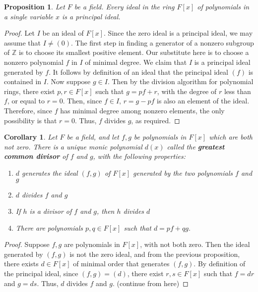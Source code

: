 \documentclass[12pt]{article}
\newtheorem{cor}[thm]{Corollary}
\newtheorem{prop}[thm]{Proposition}
\theoremstyle{definition}
\theoremstyle{remark}
\numberwithin{equation}{section}
\newcommand\Z{\mathbb Z}    %
\newcommand\B[1]{\textbf{ #1}}
\begin{document}
\begin{prop}
        Let $F$ be a field. Every ideal in the ring $F[x]$ of polynomials in a single variable $x$ is a principal ideal.
\end{prop}
\begin{proof}
        Let $I$ be an ideal of $F[x]$. Since the zero ideal is a principal ideal, we may assume that $I \neq (0)$. The first step in finding a generator of a nonzero subgroup of $\Z$ is to choose its smallest positive element. Our substitute here is to choose a nonzero polynomial $f$ in $I$ of minimal degree. We claim that $I$ is a principal ideal generated by $f$. It follows by definition of an ideal that the principal ideal $(f)$ is contained in $I$. Now suppose $g \in I$. Then by the division algorithm for polynomial rings, there exist $p,r \in F[x]$ such that $g = pf + r$, with the degree of $r$ less than $f$, or equal to $r=0$. Then, since $f \in I$, $r = g - pf$ is also an element of the ideal. Therefore, since $f$ has minimal degree among nonzero elements, the only possibility is that $r = 0$. Thus, $f$ divides $g$, as required.
\end{proof}


\vspace{15pt}

\begin{cor}
        Let $F$ be a field, and let $f,g$ be polynomials in $F[x]$ which are both not zero. There is a unique monic polynomial $d(x)$ called the \B{greatest common divisor} of $f$ and $g$, with the following properties: \begin{enumerate}
                \item $d$ generates the ideal $(f,g)$ of $F[x]$ generated by the two polynomials $f$ and $g$
                \item $d$ divides $f$ and $g$
                \item If $h$ is a divisor of $f$ and $g$, then $h$ divides $d$
                \item There are polynomials $p,q \in F[x]$ such that $d= pf+qg$.
        \end{enumerate}
\end{cor}
\begin{proof}
        Suppose $f,g$ are polynomials in $F[x]$, with not both zero. Then the ideal generated by $(f,g)$ is not the zero ideal, and from the previous proposition, there exists $d \in F[x]$ of minimal order that generates $(f,g)$. By definition of the principal ideal, since $(f,g) = (d)$, there exist $r,s \in F[x]$ such that $f = dr$ and $g = ds$. Thus, $d$ divides $f$ and $g$. (continue from here)
\end{proof}
\end{document}
